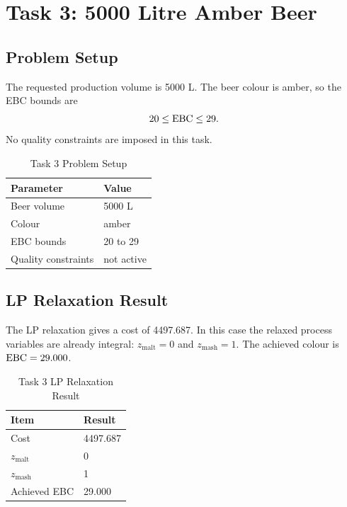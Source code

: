 \section{Task 3: 5000 Litre Amber Beer}
\label{sec:task3}

\subsection{Problem Setup}
\label{sec:task3-setup}
The requested production volume is 5000 L. The beer colour is amber, so the EBC bounds are
\[
20 \leq \mathrm{EBC} \leq 29.
\]
No quality constraints are imposed in this task.

\begin{table}[H]
\renewcommand{\arraystretch}{1.15}
\caption{Task 3 Problem Setup}
\label{tab:task33-setup}
\centering
\small
\begin{tabular}{@{}ll@{}}
\toprule
Parameter & Value \\
\midrule
Beer volume & 5000 L \\
Colour & amber \\
EBC bounds & 20 to 29 \\
Quality constraints & not active \\
\bottomrule
\end{tabular}
\end{table}

\subsection{LP Relaxation Result}
\label{sec:task3-relaxation}
The LP relaxation gives a cost of 4497.687. In this case the relaxed process variables are already integral: $z_{\mathrm{malt}}=0$ and $z_{\mathrm{mash}}=1$. The achieved colour is $\mathrm{EBC}=29.000$.

\begin{table}[H]
\renewcommand{\arraystretch}{1.15}
\caption{Task 3 LP Relaxation Result}
\label{tab:task33-relaxation}
\centering
\small
\begin{tabular}{@{}ll@{}}
\toprule
Item & Result \\
\midrule
Cost & 4497.687 \\
$z_{\mathrm{malt}}$ & 0 \\
$z_{\mathrm{mash}}$ & 1 \\
Achieved EBC & 29.000 \\
\bottomrule
\end{tabular}
\end{table}

